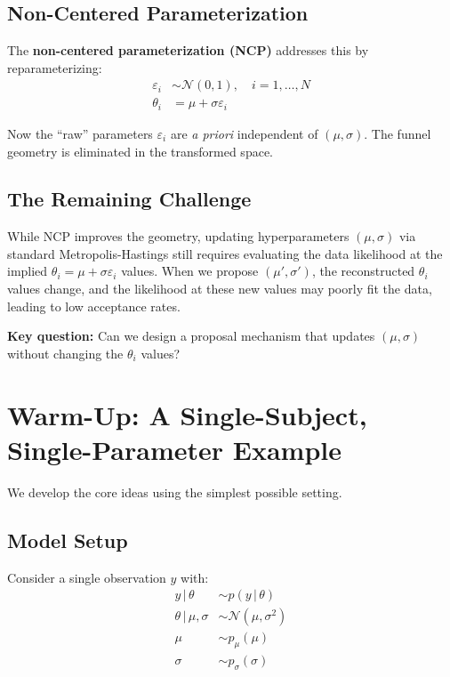 \documentclass[11pt,a4paper]{article}
\theoremstyle{definition}
\newcommand{\eps}{\varepsilon}
\newcommand{\Normal}{\mathcal{N}}
\newcommand{\given}{\,|\,}
\begin{document}
\subsection{Non-Centered Parameterization}

The \textbf{non-centered parameterization (NCP)} addresses this by reparameterizing:
\begin{align}
    \eps_i &\sim \Normal(0, 1), \quad i = 1, \ldots, N \\
    \theta_i &= \mu + \sigma \eps_i
\end{align}

Now the ``raw'' parameters $\eps_i$ are \emph{a priori} independent of $(\mu, \sigma)$.
The funnel geometry is eliminated in the transformed space.

\subsection{The Remaining Challenge}

While NCP improves the geometry, updating hyperparameters $(\mu, \sigma)$ via standard
Metropolis-Hastings still requires evaluating the data likelihood at the implied
$\theta_i = \mu + \sigma \eps_i$ values. When we propose $(\mu', \sigma')$, the
reconstructed $\theta_i$ values change, and the likelihood at these new values may
poorly fit the data, leading to low acceptance rates.

\textbf{Key question:} Can we design a proposal mechanism that updates $(\mu, \sigma)$
without changing the $\theta_i$ values?

\section{Warm-Up: A Single-Subject, Single-Parameter Example}
\label{sec:warmup}

We develop the core ideas using the simplest possible setting.

\subsection{Model Setup}

Consider a single observation $y$ with:
\begin{align}
    y \given \theta &\sim p(y \given \theta) \\
    \theta \given \mu, \sigma &\sim \Normal(\mu, \sigma^2) \\
    \mu &\sim p_\mu(\mu) \\
    \sigma &\sim p_\sigma(\sigma)
\end{align}
\end{document}
